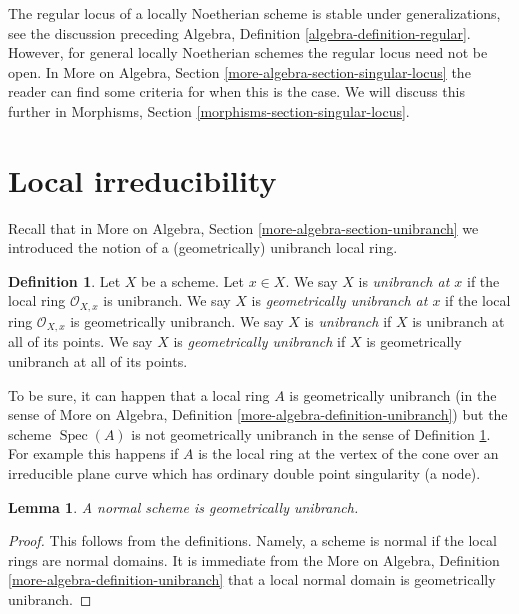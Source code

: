 \documentclass{stacks-project}
\newenvironment{reference}{\comment}{\endcomment}
\theoremstyle{plain}
\newtheorem{lemma}[subsection]{Lemma}
\theoremstyle{definition}
\newtheorem{definition}[subsection]{Definition}
\theoremstyle{remark}
\numberwithin{equation}{subsection}
\def\Spec{\mathop{\mathrm{Spec}}}
\begin{document}
\noindent
The regular locus of a locally Noetherian scheme is stable under
generalizations, see the discussion preceding
Algebra, Definition \ref{algebra-definition-regular}.
However, for general locally Noetherian schemes the regular locus
need not be open. In
More on Algebra, Section \ref{more-algebra-section-singular-locus}
the reader can find some criteria for when this is the case.
We will discuss this further in
Morphisms, Section \ref{morphisms-section-singular-locus}.






\section{Local irreducibility}
\label{section-unibranch}

\noindent
Recall that in More on Algebra, Section \ref{more-algebra-section-unibranch}
we introduced the notion of a (geometrically) unibranch local ring.

\begin{definition}
\label{definition-unibranch}
\begin{reference}
\cite[Chapter IV (6.15.1)]{EGA4}
\end{reference}
Let $X$ be a scheme. Let $x \in X$. We say $X$ is {\it unibranch at $x$}
if the local ring $\mathcal{O}_{X, x}$ is unibranch. We say $X$ is
{\it geometrically unibranch at $x$}
if the local ring $\mathcal{O}_{X, x}$ is geometrically unibranch.
We say $X$ is {\it unibranch} if $X$ is unibranch at all of its points.
We say $X$ is {\it geometrically unibranch} if $X$ is
geometrically unibranch at all of its points.
\end{definition}

\noindent
To be sure, it can happen that a local ring $A$ is geometrically unibranch
(in the sense of
More on Algebra, Definition \ref{more-algebra-definition-unibranch})
but the scheme $\Spec(A)$ is not geometrically unibranch in the sense
of Definition \ref{definition-unibranch}. For example this happens
if $A$ is the local ring at the vertex of the cone over an irreducible
plane curve which has ordinary double point singularity (a node).

\begin{lemma}
\label{lemma-normal-geometrically-unibranch}
A normal scheme is geometrically unibranch.
\end{lemma}

\begin{proof}
This follows from the definitions. Namely, a scheme
is normal if the local rings are normal domains. It is immediate
from the More on Algebra, Definition \ref{more-algebra-definition-unibranch}
that a local normal domain is geometrically unibranch.
\end{proof}
\end{document}
